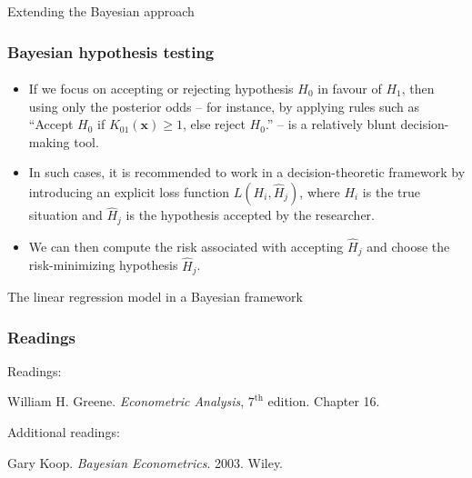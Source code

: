 \documentclass[10pt]{beamer}
\theoremstyle{definition}
\begin{document}
\begin{section}{Extending the Bayesian approach}
\begin{frame}[fragile]
\frametitle{Bayesian hypothesis testing}
\framesubtitle{}
\begin{itemize}\itemsep1em
\item If we focus on accepting or rejecting hypothesis $H_0$ in favour of $H_1$, then using only the posterior odds -- for instance, by applying rules such as ``Accept $H_0$ if $K_{01}(\mathbf{x})\geq 1$, else reject $H_0$.'' -- is a relatively blunt decision-making tool.
\item In such cases, it is recommended to work in a decision-theoretic framework by introducing an explicit loss function $L(H_i,\hat{H}_j)$, where $H_i$ is the true situation and $\hat{H}_j$ is the hypothesis accepted by the researcher.
\item  We can then compute the risk associated with accepting  $\hat{H}_j$ and choose the risk-minimizing hypothesis $\hat{H}_j$.
\end{itemize}
\end{frame}


















\end{section}

\begin{section}{The linear regression model in a Bayesian framework}\label{sec:BayesLM}

\end{section}


\begin{frame}[fragile]
\frametitle{Readings}
Readings:\bigskip

William H. Greene. \emph{Econometric Analysis}, $ 7^{\text{th}} $ edition. Chapter 16.\bigskip

Additional readings:\bigskip

Gary Koop. \emph{Bayesian Econometrics}. 2003. Wiley.
\end{frame}
\end{document}
